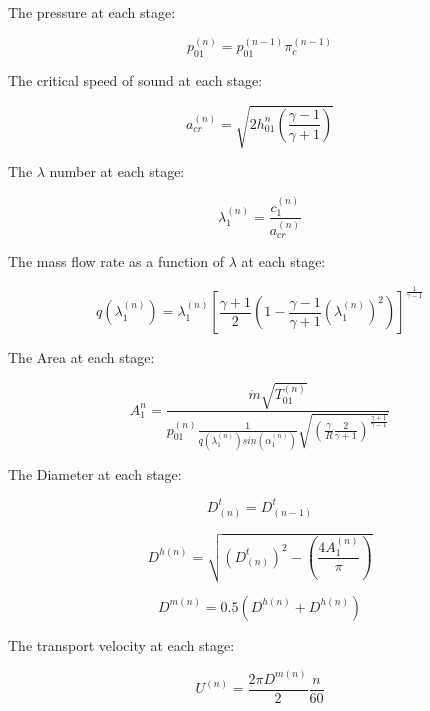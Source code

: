 \documentclass[titlepage]{article}
\begin{document}
The pressure at each stage:

\begin{equation}
    p_{01}^{(n)} = p_{01}^{(n-1)} \pi_{c}^{(n-1)}
\end{equation}

The critical speed of sound at each stage:

\begin{equation}
    a_{cr}^{(n)} = \sqrt{2 h_{01}^{n}\left(\frac{\gamma-1}{\gamma+1}\right)}
\end{equation}

The $\lambda$ number at each stage:

\begin{equation}
    \lambda_{1}^{(n)} = \frac{c_{1}^{(n)}}{a_{cr}^{(n)}}
\end{equation}

The mass flow rate as a function of $\lambda$ at each stage:

\begin{equation}
    q(\lambda_{1}^{(n)}) = \lambda_{1}^{(n)} \left[ \frac{\gamma+1}{2} \left(1 - \frac{\gamma-1 }{\gamma+1} (\lambda_{1}^{(n)})^{2} \right)\right]^{\frac{1}{\gamma-1}}                               
\end{equation}


The Area at each stage:

\begin{equation}
    A_{1}^{n} = \frac{\dot{m} \sqrt{T_{01}^{(n)}}}{p_{01}^{(n)} \frac{1}{q(\lambda_{1}^{(n)}) sin(\alpha_{1}^{(n)})} \sqrt{\left(\frac{\gamma}{R} \frac{2}{\gamma+1}\right)^{\frac{\gamma+1}{\gamma-1}}}}                   
\end{equation}


The Diameter at each stage:

\begin{equation}
    D_{(n)}^{t} = D_{(n-1)}^{t} 
\end{equation}

\begin{equation}
    D^{h(n)} = \sqrt{ \left(D_{(n)}^{t} \right)^{2} - \left( \frac{4 A_{1}^{(n)}}{\pi} \right)}
\end{equation}

\begin{equation}
    D^{m(n)} = 0.5 (D^{h(n)} + D^{h(n)})    
\end{equation}

The transport velocity at each stage:

\begin{equation}
    U^{(n)} = \frac{2 \pi D^{m(n)}}{2} \frac{n}{60}
\end{equation}
\end{document}
